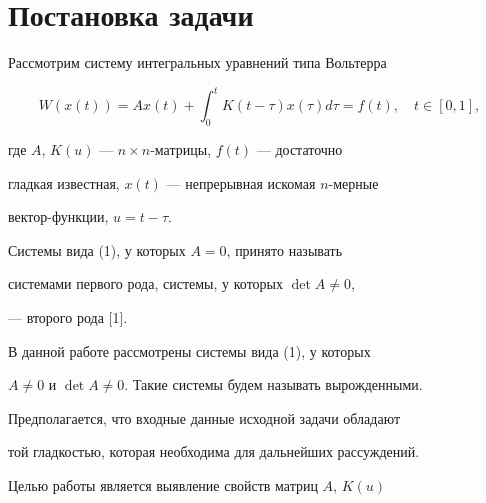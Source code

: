  


 




 


\maketitle 


\label{begin} 


 


\section{Постановка задачи} 


 


Рассмотрим систему интегральных уравнений типа Вольтерра 


\begin{equation} 


W(x(t))=Ax(t)+\int^t_0 K(t-\tau)x(\tau)d\tau=f(t),\quad 


t\in[0,1], 


\end{equation} 


где $A$, $K(u)$ --- $n\times n$-матрицы, $f(t)$ --- достаточно 


гладкая известная, $x(t)$ --- непрерывная искомая $n$-мерные 


вектор-функции, $u=t-\tau$. 


 


Системы вида (1), у которых $A=0$, принято называть 


системами первого рода, системы, у которых $\det A\ne 0$, 


--- второго рода [1]. 


 


В данной работе рассмотрены системы вида (1), у которых 


$A\ne 0$ и $\det A\ne 0$. Такие системы будем называть вырожденными. 


Предполагается, что входные данные исходной задачи обладают 


той гладкостью, которая необходима для дальнейших рассуждений. 


Целью работы является выявление свойств матриц $A$, $K(u)$ 


